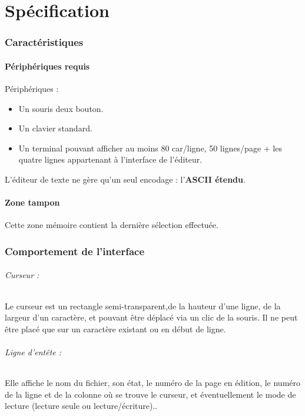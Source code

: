 \part{Spécification}

\section{Caractéristiques}
\subsection{Périphériques requis}
Périphériques :
\begin{itemize}
	\item Un souris deux bouton.
	\item Un clavier standard.
	\item Un terminal pouvant afficher au moins 80 car/ligne, 50 lignes/page + les quatre lignes appartenant à l'interface de l'éditeur.\\
\end{itemize}

L'éditeur de texte ne gère qu'un seul encodage : l'\textbf{ASCII étendu}.

\subsection{Zone tampon}
Cette zone mémoire contient la dernière sélection effectuée.

\section{Comportement de l'interface}

\paragraph{Curseur :} Le curseur est un rectangle semi-transparent,de la hauteur d'une ligne, de la largeur d'un caractère, et pouvant être déplacé via un clic de la souris. Il ne peut être placé que sur un caractère existant ou en début de ligne.

\paragraph{Ligne d'entête :} Elle affiche le nom du fichier, son état, le
numéro de la page en édition, le numéro de la ligne et de la colonne où se
trouve le curseur, et éventuellement le mode de lecture (lecture seule ou
lecture/écriture)..

